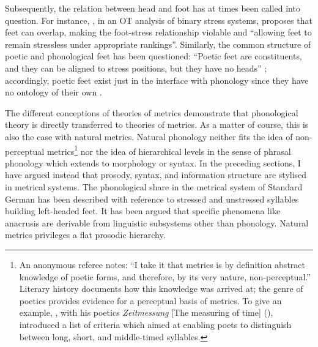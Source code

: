 \documentclass[output=paper
  ,nobabel
  ,uniformtopskip %
]{langscibook}
\begin{document}
\noindent
Subsequently, the relation between head and foot has at times been called into question. For
instance, \citet[313]{Hyde2002}, in an OT analysis of binary stress systems, proposes that feet can
overlap, making the foot-stress relationship violable and ``allowing feet to remain stressless under
appropriate rankings''. Similarly, the common structure of poetic and phonological feet has been questioned: ``Poetic feet are constituents, and they can be aligned to
stress positions, but they have no heads'' \citep[1]{VanOostendorp2017}; accordingly, poetic feet
exist just in the interface with phonology since they have no ontology of their own
\citep[11]{VanOostendorp2017}. 

The different conceptions of theories of metrics demonstrate that phonological theory is directly
transferred to theories of metrics. As a matter of course, this is also the case with natural
metrics. Natural phonology neither fits the idea of non-perceptual metrics\footnote{An anonymous
  referee notes: ``I take it that metrics is by definition abstract knowledge of poetic forms, and
  therefore, by its very nature, non-perceptual.'' Literary history documents how this knowledge was
  arrived at; the genre of poetics provides evidence for a perceptual basis of metrics. To give an
  example, \citeauthor{Voss1802}, with his poetics \emph{Zeitmessung} [The measuring of time]
  (\citeyear{Voss1802}), introduced a list of criteria which aimed at enabling poets to distinguish
  between long, short, and middle-timed syllables.} nor the idea of hierarchical levels in the sense
of phrasal phonology which extends to morphology or syntax. In the preceding sections, I have argued
instead that prosody, syntax, and information structure are stylised in metrical systems. The
phonological share in the metrical system of Standard German has been described with reference to
stressed and unstressed syllables building left-headed feet. It has been argued that specific
phenomena like anacrusis are derivable from linguistic subsystems other than phonology. Natural
metrics privileges a flat prosodic hierarchy.
\end{document}
